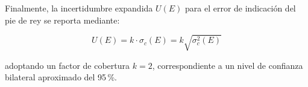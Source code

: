 Finalmente, la incertidumbre expandida $U(E)$ para el error de indicación del pie de rey se reporta mediante:

\begin{equation}
    U(E) = k \cdot \sigma_c(E) = k \sqrt{\sigma_c^2(E)}
    \label{eq:incertidumbre-expandida}
\end{equation}

adoptando un factor de cobertura $k = 2$, correspondiente a un nivel de confianza bilateral aproximado del 95\,\%.

